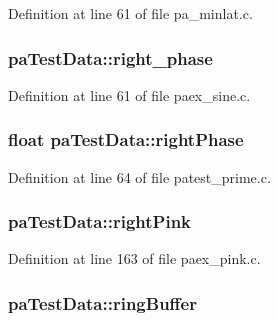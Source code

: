 Definition at line 61 of file pa\+\_\+minlat.\+c.

\subsubsection[{\texorpdfstring{right\+\_\+phase}{right_phase}}]{ pa\+Test\+Data\+::right\+\_\+phase}\hypertarget{structpa_test_data_ac76fb867d4b48bfea1554ad15b5dcf64}{}\label{structpa_test_data_ac76fb867d4b48bfea1554ad15b5dcf64}


Definition at line 61 of file paex\+\_\+sine.\+c.

\subsubsection[{\texorpdfstring{right\+Phase}{rightPhase}}]{\setlength{\rightskip}{0pt plus 5cm}float pa\+Test\+Data\+::right\+Phase}\hypertarget{structpa_test_data_afbc8dc6c4de93721d9049b62988da99a}{}\label{structpa_test_data_afbc8dc6c4de93721d9049b62988da99a}


Definition at line 64 of file patest\+\_\+prime.\+c.

\subsubsection[{\texorpdfstring{right\+Pink}{rightPink}}]{ pa\+Test\+Data\+::right\+Pink}\hypertarget{structpa_test_data_a39779211244c56e7c6a5cff3f06db5eb}{}\label{structpa_test_data_a39779211244c56e7c6a5cff3f06db5eb}


Definition at line 163 of file paex\+\_\+pink.\+c.

\subsubsection[{\texorpdfstring{ring\+Buffer}{ringBuffer}}]{ pa\+Test\+Data\+::ring\+Buffer}\hypertarget{structpa_test_data_a7ddec58e0c095185f71e7777b419ab52}{}\label{structpa_test_data_a7ddec58e0c095185f71e7777b419ab52}


